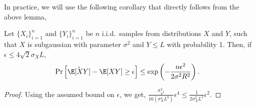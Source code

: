 In practice, we will use the following corollary that directly follows from the above lemma,
\begin{corollary}
  Let $\{X_i\}_{i=1}^n$ and $\{Y_i\}_{i=1}^n$ be $n$ i.i.d.\
  samples from distributions $X$ and $Y$, such that $X$ is subgaussian with parameter
  $\sigma^2$ and $Y \le L$ with probability 1. Then, if $\epsilon \le 4\sqrt{2} \sigma_X L$,
  \begin{align}
    \Pr\left[ \hat\E[ X Y ] - \E[ X Y ] \ge \epsilon \right] 
    &\le \exp\left( - \frac{n \epsilon^2}{2 \sigma^2 R^2 } \right).
  \end{align}
\end{corollary}
\begin{proof}
  Using the assumed bound on $\epsilon$, we get,
  $\frac{\sigma^2_{Y^2}}{16 (\sigma^4_X L^8)} \epsilon^{4} \le \frac{1}{2\sigma^2_X L^2} \epsilon^{2}$.
\end{proof}
